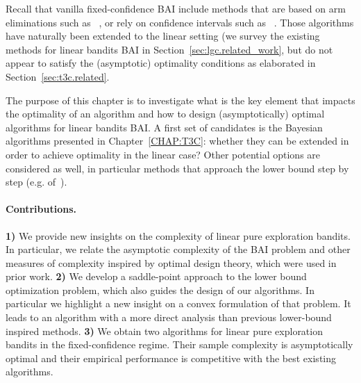 Recall that vanilla fixed-confidence BAI include methods that are based on arm eliminations such as \SE~\citep{karnin2013sha}, or rely on confidence intervals such as \UGapE~\citep{gabillon2012ugape}. Those algorithms have naturally been extended to the linear setting (we survey the existing methods for linear bandits BAI in Section~\ref{sec:lgc.related_work}, but do not appear to satisfy the (asymptotic) optimality conditions as elaborated in Section~\ref{sec:t3c.related}. 

The purpose of this chapter is to investigate what is the key element that impacts the optimality of an algorithm and how to design (asymptotically) optimal algorithms for linear bandits BAI. A first set of candidates is the Bayesian algorithms presented in Chapter~\ref{CHAP:T3C}: whether they can be extended in order to achieve optimality in the linear case? Other potential options are considered as well, in particular methods that approach the lower bound step by step (e.g. \Track of~\citealt{garivier2016tracknstop}).

\paragraph{Contributions.}
\textbf{1)}
We provide new insights on the complexity of linear pure exploration bandits. In particular, we relate the asymptotic complexity of the BAI problem and other measures of complexity inspired by optimal design theory, which were used in prior work.
\textbf{2)}
We develop a saddle-point approach to the lower bound optimization problem, which also guides the design of our algorithms. In particular we highlight a new insight on a convex formulation of that problem. It leads to an algorithm with a more direct analysis than previous lower-bound inspired methods.
\textbf{3)}
We obtain two algorithms for linear pure exploration bandits in the fixed-confidence regime. Their sample complexity is asymptotically optimal and their empirical performance is competitive with the best existing algorithms.

%
%
%
